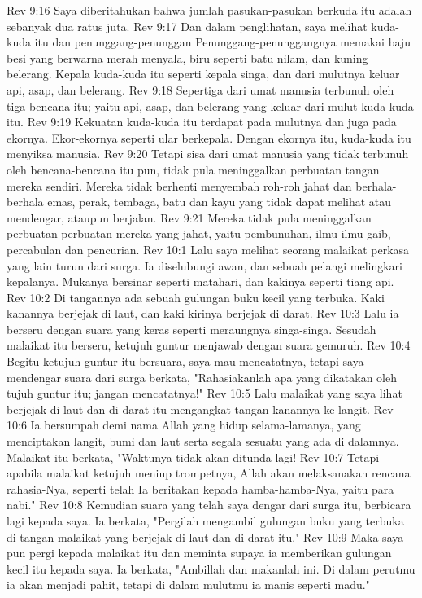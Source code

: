 Rev 9:16  Saya diberitahukan bahwa jumlah pasukan-pasukan berkuda itu adalah sebanyak dua ratus juta.
Rev 9:17  Dan dalam penglihatan, saya melihat kuda-kuda itu dan penunggang-penunggan Penunggang-penunggangnya memakai baju besi yang berwarna merah menyala, biru seperti batu nilam, dan kuning belerang. Kepala kuda-kuda itu seperti kepala singa, dan dari mulutnya keluar api, asap, dan belerang.
Rev 9:18  Sepertiga dari umat manusia terbunuh oleh tiga bencana itu; yaitu api, asap, dan belerang yang keluar dari mulut kuda-kuda itu.
Rev 9:19  Kekuatan kuda-kuda itu terdapat pada mulutnya dan juga pada ekornya. Ekor-ekornya seperti ular berkepala. Dengan ekornya itu, kuda-kuda itu menyiksa manusia.
Rev 9:20  Tetapi sisa dari umat manusia yang tidak terbunuh oleh bencana-bencana itu pun, tidak pula meninggalkan perbuatan tangan mereka sendiri. Mereka tidak berhenti menyembah roh-roh jahat dan berhala-berhala emas, perak, tembaga, batu dan kayu yang tidak dapat melihat atau mendengar, ataupun berjalan.
Rev 9:21  Mereka tidak pula meninggalkan perbuatan-perbuatan mereka yang jahat, yaitu pembunuhan, ilmu-ilmu gaib, percabulan dan pencurian.
Rev 10:1  Lalu saya melihat seorang malaikat perkasa yang lain turun dari surga. Ia diselubungi awan, dan sebuah pelangi melingkari kepalanya. Mukanya bersinar seperti matahari, dan kakinya seperti tiang api.
Rev 10:2  Di tangannya ada sebuah gulungan buku kecil yang terbuka. Kaki kanannya berjejak di laut, dan kaki kirinya berjejak di darat.
Rev 10:3  Lalu ia berseru dengan suara yang keras seperti meraungnya singa-singa. Sesudah malaikat itu berseru, ketujuh guntur menjawab dengan suara gemuruh.
Rev 10:4  Begitu ketujuh guntur itu bersuara, saya mau mencatatnya, tetapi saya mendengar suara dari surga berkata, "Rahasiakanlah apa yang dikatakan oleh tujuh guntur itu; jangan mencatatnya!"
Rev 10:5  Lalu malaikat yang saya lihat berjejak di laut dan di darat itu mengangkat tangan kanannya ke langit.
Rev 10:6  Ia bersumpah demi nama Allah yang hidup selama-lamanya, yang menciptakan langit, bumi dan laut serta segala sesuatu yang ada di dalamnya. Malaikat itu berkata, "Waktunya tidak akan ditunda lagi!
Rev 10:7  Tetapi apabila malaikat ketujuh meniup trompetnya, Allah akan melaksanakan rencana rahasia-Nya, seperti telah Ia beritakan kepada hamba-hamba-Nya, yaitu para nabi."
Rev 10:8  Kemudian suara yang telah saya dengar dari surga itu, berbicara lagi kepada saya. Ia berkata, "Pergilah mengambil gulungan buku yang terbuka di tangan malaikat yang berjejak di laut dan di darat itu."
Rev 10:9  Maka saya pun pergi kepada malaikat itu dan meminta supaya ia memberikan gulungan kecil itu kepada saya. Ia berkata, "Ambillah dan makanlah ini. Di dalam perutmu ia akan menjadi pahit, tetapi di dalam mulutmu ia manis seperti madu."
